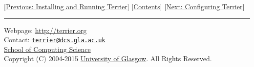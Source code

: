 {[}\href{quickstart.html}{Previous: Installing and Running Terrier}{]}
{[}\href{index.html}{Contents}{]} {[}\href{configure_general.html}{Next:
Configuring Terrier}{]}

\begin{center}\rule{0.5\linewidth}{\linethickness}\end{center}

Webpage: \url{http://terrier.org}\\
Contact:
\href{mailto:terrier@dcs.gla.ac.uk}{\nolinkurl{terrier@dcs.gla.ac.uk}}\\
\href{http://www.dcs.gla.ac.uk/}{School of Computing Science}\\
Copyright (C) 2004-2015 \href{http://www.gla.ac.uk/}{University of
Glasgow}. All Rights Reserved.

